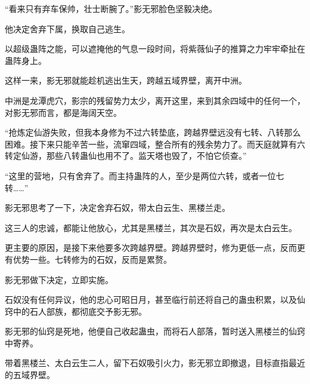 \begin{this_body}
“看来只有弃车保帅，壮士断腕了。”影无邪脸色坚毅决绝。

他决定舍弃下属，换取自己逃生。

以超级蛊阵之能，可以遮掩他的气息一段时间，将紫薇仙子的推算之力牢牢牵扯在蛊阵身上。

这样一来，影无邪就能趁机逃出生天，跨越五域界壁，离开中洲。

中洲是龙潭虎穴，影宗的残留势力太少，离开这里，来到其余四域中的任何一个，对影无邪而言，都是海阔天空。

“抢炼定仙游失败，但我本身修为不过六转垫底，跨越界壁远没有七转、八转那么困难。接下来只能辛苦一些，流窜四域，整合所有的残余势力了。而天庭就算有六转定仙游，那些八转蛊仙也用不了。监天塔也毁了，不怕它侦查。”

“这里的营地，只有舍弃了。而主持蛊阵的人，至少是两位六转，或者一位七转……”

影无邪思考了一下，决定舍弃石奴，带太白云生、黑楼兰走。

这三人的忠诚，都能让他放心，尤其是黑楼兰，其次是石奴，再次是太白云生。

更主要的原因，是接下来他要多次跨越界壁。跨越界壁时，修为更低一点，反而更有优势一些。七转修为的石奴，反而是累赘。

影无邪做下决定，立即实施。

石奴没有任何异议，他的忠心可昭日月，甚至临行前还将自己的蛊虫积累，以及仙窍中的石人部族，都彻底交予影无邪。

影无邪的仙窍是死地，他便自己收起蛊虫，而将石人部落，暂时送入黑楼兰的仙窍中寄养。

带着黑楼兰、太白云生二人，留下石奴吸引火力，影无邪立即撤退，目标直指最近的五域界壁。

\end{this_body}

